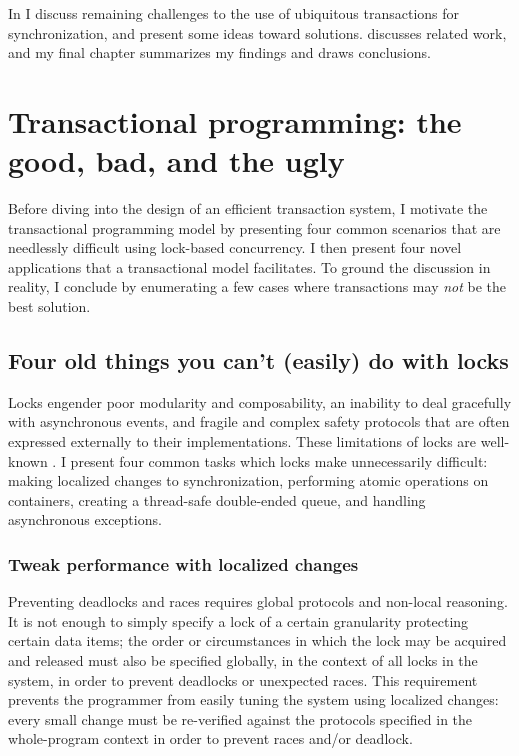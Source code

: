 In  I discuss remaining challenges to the use of
ubiquitous transactions for synchronization, and present some ideas
toward solutions.  discusses related work, and my
final chapter summarizes my findings and draws conclusions.


\chapter{Transactional programming: the good, bad, and the ugly}
\label{cha:examples}

Before diving into the design of an efficient transaction system,
I motivate the transactional programming model by
presenting four common scenarios that are needlessly
difficult using lock-based concurrency.  I then present four novel
applications that a transactional model facilitates.  To ground the
discussion in reality, I conclude by enumerating a few cases where
transactions may \emph{not} be the best solution.

\section{Four old things you can't (easily) do with locks}
Locks engender poor modularity and composability, an inability to deal
gracefully with asynchronous events, and fragile and complex safety
protocols that are often expressed externally to their
implementations.  These limitations of locks are well-known
\cite{Herlihy05}.  I present four common tasks which locks make
unnecessarily difficult: making localized changes to synchronization,
performing atomic operations on containers, creating a thread-safe
double-ended queue, and handling asynchronous exceptions.

\subsection{Tweak performance with localized changes}
Preventing deadlocks and races requires global protocols and non-local
reasoning.  It is not enough to simply specify a lock of a certain
granularity protecting certain data items; the order or circumstances
in which the lock may be acquired and released must also be specified
globally, in the context of all locks in the system, in order to
prevent deadlocks or unexpected races.  This requirement prevents the
programmer from easily tuning the system using localized changes:
every small change must be re-verified against the protocols specified
in the whole-program context in order to prevent races and/or
deadlock.

